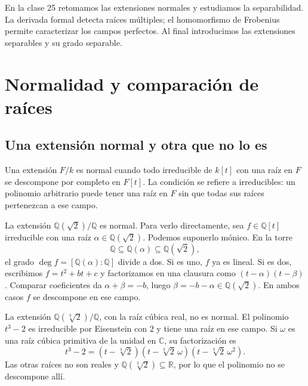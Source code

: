 En la clase 25 retomamos las extensiones normales y estudiamos la separabilidad. La derivada formal detecta raíces múltiples; el homomorfismo de Frobenius permite caracterizar los campos perfectos. Al final introducimos las extensiones separables y su grado separable.

\section{Normalidad y comparación de raíces}
\subsection{Una extensión normal y otra que no lo es}
Una extensión $F/k$ es normal cuando todo irreducible de $k[t]$ con una raíz en $F$ se descompone por completo en $F[t]$. La condición se refiere a irreducibles: un polinomio arbitrario puede tener una raíz en $F$ sin que todas sus raíces pertenezcan a ese campo.

\begin{ejem}
La extensión $\mathbb Q(\sqrt2)/\mathbb Q$ es normal. Para verlo directamente, sea $f\in\mathbb Q[t]$ irreducible con una raíz $\alpha\in\mathbb Q(\sqrt2)$. Podemos suponerlo mónico. En la torre
\[
\mathbb Q\subseteq\mathbb Q(\alpha)\subseteq\mathbb Q(\sqrt2),
\]
el grado $\deg f=[\mathbb Q(\alpha):\mathbb Q]$ divide a dos. Si es uno, $f$ ya es lineal. Si es dos, escribimos $f=t^2+bt+c$ y factorizamos en una clausura como $(t-\alpha)(t-\beta)$. Comparar coeficientes da $\alpha+\beta=-b$, luego $\beta=-b-\alpha\in\mathbb Q(\sqrt2)$. En ambos casos $f$ se descompone en ese campo.
\end{ejem}

\begin{ejem}
La extensión $\mathbb Q(\sqrt[3]{2})/\mathbb Q$, con la raíz cúbica real, no es normal. El polinomio $t^3-2$ es irreducible por Eisenstein con $2$ y tiene una raíz en ese campo. Si $\omega$ es una raíz cúbica primitiva de la unidad en $\mathbb C$, su factorización es
\[
t^3-2=(t-\sqrt[3]{2})(t-\sqrt[3]{2}\,\omega)
(t-\sqrt[3]{2}\,\omega^2).
\]
Las otras raíces no son reales y $\mathbb Q(\sqrt[3]{2})\subseteq\mathbb R$, por lo que el polinomio no se descompone allí.
\end{ejem}

